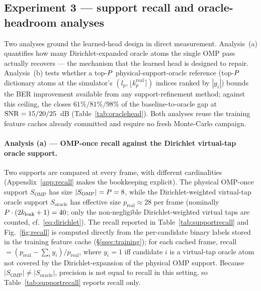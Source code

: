 \subsection{Experiment 3 --- support recall and oracle-headroom analyses}
\label{ssec:probes}

Two analyses ground the learned-head design in direct measurement. Analysis~(a) quantifies how many Dirichlet-expanded oracle atoms the single OMP pass actually recovers --- the mechanism that the learned head is designed to repair. Analysis~(b) tests whether a top-$P$ physical-support-oracle reference (top-$P$ dictionary atoms at the simulator's $(l_p, \lfloor k_p^\text{real}\rceil)$ indices ranked by $|g_i|$) bounds the BER improvement available from any support-refinement method; against this ceiling, the \LearnedHead{} closes $61\%/81\%/98\%$ of the baseline-to-oracle gap at $\mathrm{SNR} = 15/20/25$~dB (Table~\ref{tab:oraclehead}). Both analyses reuse the training feature caches already committed and require no fresh Monte-Carlo campaign.

\paragraph{Analysis (a) --- OMP-once recall against the Dirichlet virtual-tap oracle support.}
Two supports are compared at every frame, with different cardinalities (Appendix~\ref{app:recall} makes the bookkeeping explicit). The physical OMP-once support $S_\text{OMP}$ has size $|S_\text{OMP}| = P = 8$, while the Dirichlet-weighted virtual-tap oracle support $S_\text{oracle}$ has effective size $p_{\text{real}} \approx 28$ per frame (nominally $P \cdot (2k_{\mathrm{leak}} + 1) = 40$; only the non-negligible Dirichlet-weighted virtual taps are counted, cf.\ \eqref{eq:dirichlet}). The recall reported in Table~\ref{tab:supportrecall} and Fig.~\ref{fig:recall} is computed directly from the per-candidate binary labels stored in the training feature cache (\S\ref{ssec:training}); for each cached frame, recall $= (p_{\text{real}} - \sum_i y_i) / p_{\text{real}}$, where $y_i = 1$ iff candidate $i$ is a virtual-tap oracle atom not covered by the Dirichlet-expansion of the physical OMP support. Because $|S_\text{OMP}| \neq |S_\text{oracle}|$, precision is not equal to recall in this setting, so Table~\ref{tab:supportrecall} reports recall only.

